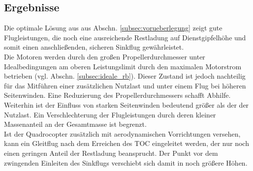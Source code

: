 \subsection{Ergebnisse}
\label{subsec:ergebnisse}
Die optimale Lösung aus aus Abschn. \ref{subsec:vorueberlegung} zeigt gute Flugleistungen, die noch eine ausreichende Restladung auf Dienstgipfelhöhe und somit einen anschließenden, sicheren Sinkflug gewährleistet. \\
Die Motoren werden durch den großen Propellerdurchmesser unter Idealbedingungen am oberen Leistungslimit durch den maximalen Motorstrom betrieben (vgl. Abschn. \ref{subsec:ideale_rb}). Dieser Zustand ist jedoch nachteilig für das Mitführen einer zusätzlichen Nutzlast und unter einem Flug bei höheren Seitenwinden. Eine Reduzierung des Propellerdurchmessers schafft Abhilfe. Weiterhin ist der Einfluss von starken Seitenwinden bedeutend größer als der der Nutzlast. Ein Verschlechterung der Flugleistungen durch deren kleiner Massenanteil an der Gesamtmasse ist begrenzt.\\
Ist der Quadrocopter zusätzlich mit aerodynamischen Vorrichtungen versehen, kann ein Gleitflug nach dem Erreichen des TOC eingeleitet werden, der nur noch einen geringen Anteil der Restladung beansprucht. Der Punkt vor dem zwingenden Einleiten des Sinkflugs verschiebt sich damit in noch größere Höhen.
